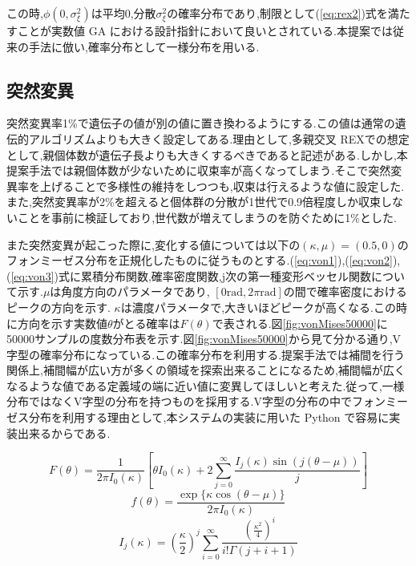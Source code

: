 この時,$\phi(0,\sigma^2_\xi)$は平均0,分散$\sigma^2_\xi$の確率分布であり,制限として(\ref{eq:rex2})式を満たすことが実数値 GA における設計指針において良い\cite{小林重信2009実数値}とされている.本提案では従来の手法に倣い,確率分布として一様分布を用いる.

\subsection{突然変異}
突然変異率1\%で遺伝子の値が別の値に置き換わるようにする.この値は通常の遺伝的アルゴリズムよりも大きく設定してある.理由として,多親交叉 REX\cite{小林重信2009実数値}での想定として,親個体数が遺伝子長よりも大きくするべきであると記述がある.しかし,本提案手法では親個体数が少ないために収束率が高くなってしまう.そこで突然変異率を上げることで多様性の維持をしつつも,収束は行えるような値に設定した.また,突然変異率が2\%を超えると個体群の分散が1世代で0.9倍程度しか収束しないことを事前に検証しており,世代数が増えてしまうのを防ぐために1\%とした.


また突然変異が起こった際に,変化する値については以下の$(\kappa,\mu)=(0.5,0)$のフォンミーゼス分布\cite{vonMisesDist}を正規化したものに従うものとする.(\ref{eq:von1}),(\ref{eq:von2}),(\ref{eq:von3})式に累積分布関数,確率密度関数,j次の第一種変形ベッセル関数について示す.$\mu$は角度方向のパラメータであり, $[0\mathrm{rad},2\pi \mathrm{rad}]$の間で確率密度における
ピークの方向を示す. $\kappa$は濃度パラメータで,大きいほどピークが高くなる.この時に方向を示す実数値$\theta$がとる確率は$F(\theta)$で表される.図\ref{fig:vonMises50000}に50000サンプルの度数分布表を示す.図\ref{fig:vonMises50000}から見て分かる通り,V字型の確率分布になっている.この確率分布を利用する.提案手法では補間を行う関係上,補間幅が広い方が多くの領域を探索出来ることになるため,補間幅が広くなるような値である定義域の端に近い値に変異してほしいと考えた.従って,一様分布ではなくV字型の分布を持つものを採用する.V字型の分布の中でフォンミーゼス分布を利用する理由として,本システムの実装に用いた Python で容易に実装出来るからである.

\begin{equation}\label{eq:von1}
F(\theta) = \frac{1}{2\pi I_{0}(\kappa)} \left[\theta I_{0}(\kappa) + 2 \sum_{j=0}^{\infty} \frac{I_{j}(\kappa) \sin(j(\theta - \mu))}{j}\right]
\end{equation}
\begin{equation}\label{eq:von2}
f(\theta) = \frac{\exp\{\kappa \cos(\theta - \mu)\}}{2\pi I_{0}(\kappa)}
\end{equation}
\begin{equation}\label{eq:von3}
I_{j}(\kappa) = \left(\frac{\kappa}{2}\right)^{j} \sum_{i=0}^{\infty} \frac{\left(\frac{\kappa^{2}}{4}\right)^{i}}{i!\Gamma(j+i+1)}
\end{equation}

